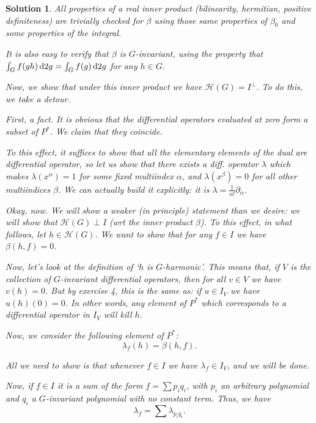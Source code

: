 \documentclass{article}
\theoremstyle{nonumberplain}
\newtheorem{sol}{Solution}
\newcommand{\HH}{\mathcal{H}}
\begin{document}
\begin{sol}
All properties of a real inner product (bilinearity, hermitian, positive definiteness) are trivially checked for $\beta$ using those same properties of $\beta_0$ and some properties of the integral.

It is also easy to verify that $\beta$ is $G$-invariant, using the property that $\int_G f(gh) \dl2 g = \int_G f(g) \dl2 g$ for any $h \in G$.

\smallskip

Now, we show that under this inner product we have $\HH(G) = I^\perp$. To do this, we take a detour.

First, a fact. It is obvious that the differential operators evaluated at zero form a subset of $P^*$. We claim that they coincide.

To this effect, it suffices to show that all the elementary elements of the dual are differential operator, so let us show that there exists a diff. operator $\lambda$ which makes $\lambda(x^\alpha) = 1$ for some fixed multiindex $\alpha$, and $\lambda(x^\beta) = 0$ for all other multiindices $\beta$. We can actually build it explicitly: it is $\lambda = \frac1{\alpha!} \partial_\alpha$.

Okay, now. We will show a weaker (in principle) statement than we desire: we will show that $\HH(G) \perp I$ (wrt the inner product $\beta$). To this effect, in what follows, let $h \in \HH(G)$. We want to show that for any $f \in I$ we have $\beta(h,f) = 0$.

Now, let's look at the definition of `$h$ is $G$-harmonic'. This means that, if $V$ is the collection of $G$-invariant differential operators, then for all $v \in V$ we have $v(h) = 0$. But by exercise 4, this is the same as: if $u \in I_V$ we have $u(h)(0) = 0$. In other words, any element of $P^*$ which corresponds to a differential operator in $I_V$ will kill $h$.

Now, we consider the following element of $P^*$:
\begin{equation}
\lambda_f(h) = \beta(h,f).
\end{equation}

All we need to show is that whenever $f \in I$ we have $\lambda_f \in I_V$, and we will be done.

Now, if $f \in I$ it is a sum of the form $f = \sum p_i q_i$, with $p_i$ an arbitrary polynomial and $q_i$ a $G$-invariant polynomial with no constant term. Thus, we have
\begin{equation}
\lambda_f = \sum \lambda_{p_i q_i}.
\end{equation}


\end{sol}
\end{document}
